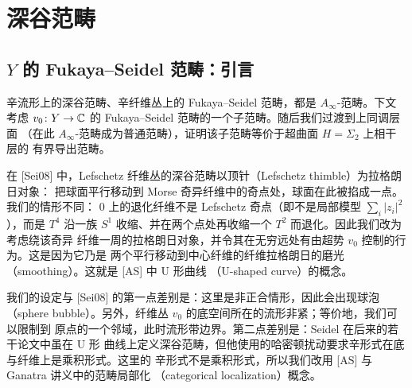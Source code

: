 \section{深谷范畴}

\subsection{$Y$ 的 Fukaya--Seidel 范畴：引言}

辛流形上的深谷范畴、辛纤维丛上的 Fukaya--Seidel 范畴，都是 $A_\infty$-范畴。下文考虑
$v_0\colon Y\to\mathbb{C}$ 的 Fukaya--Seidel 范畴的一个子范畴。随后我们过渡到上同调层面
（在此 $A_\infty$-范畴成为普通范畴），证明该子范畴等价于超曲面 $H=\Sigma_2$ 上相干层的
有界导出范畴。


\begin{remark}\label{rem:4-1-1}
在 [Sei08] 中，Lefschetz 纤维丛的深谷范畴以顶针（Lefschetz thimble）为拉格朗日对象：
把球面平行移动到 Morse 奇异纤维中的奇点处，球面在此被掐成一点。我们的情形不同：
$0$ 上的退化纤维不是 Lefschetz 奇点（即不是局部模型 $\sum_i|z_i|^2$），而是 $T^4$
沿一族 $S^1$ 收缩、并在两个点处再收缩一个 $T^2$ 而退化。因此我们改为考虑绕该奇异
纤维一周的拉格朗日对象，并令其在无穷远处有由超势 $v_0$ 控制的行为。这是因为它乃是
两个平行移动到中心纤维的纤维拉格朗日的磨光（smoothing）。这就是 [AS] 中 U 形曲线
（U-shaped curve）的概念。
\end{remark}


我们的设定与 [Sei08] 的第一点差别是：这里是非正合情形，因此会出现球泡
（sphere bubble）。另外，纤维丛 $v_0$ 的底空间所在的流形非紧；等价地，我们可以限制到
原点的一个邻域，此时流形带边界。第二点差别是：Seidel 在后来的若干论文中虽在 U 形
曲线上定义深谷范畴，但他使用的哈密顿扰动要求辛形式在底与纤维上是乘积形式。这里的
辛形式不是乘积形式，所以我们改用 [AS] 与 Ganatra 讲义中的范畴局部化
（categorical localization）概念。

